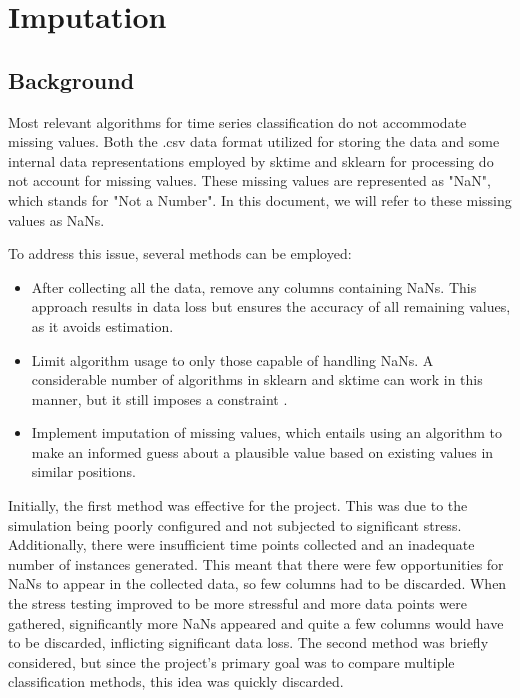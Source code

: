 
\section{Imputation}

\subsection{Background}
Most relevant algorithms for time series classification do not accommodate missing values. Both the .csv data format utilized for storing the data and some internal data representations employed by sktime and sklearn for processing do not account for missing values. These missing values are represented as "NaN", which stands for "Not a Number". In this document, we will refer to these missing values as NaNs.

To address this issue, several methods can be employed:
\begin{itemize}
\item After collecting all the data, remove any columns containing NaNs. This approach results in data loss but ensures the accuracy of all remaining values, as it avoids estimation.
\item Limit algorithm usage to only those capable of handling NaNs. A considerable number of algorithms in sklearn and sktime can work in this manner, but it still imposes a constraint \cite*{Scikit-learn-imputation}.
\item Implement imputation of missing values, which entails using an algorithm to make an informed guess about a plausible value based on existing values in similar positions.
\end{itemize}

Initially, the first method was effective for the project. This was due to the simulation being poorly configured and not subjected to significant stress. Additionally, there were insufficient time points collected and an inadequate number of instances generated. This meant that there were few opportunities for NaNs to appear in the collected data, so few columns had to be discarded. When the stress testing improved to be more stressful and more data points were gathered, significantly more NaNs appeared and quite a few columns would have to be discarded, inflicting significant data loss.
The second method was briefly considered, but since the project's primary goal was to compare multiple classification methods, this idea was quickly discarded.

